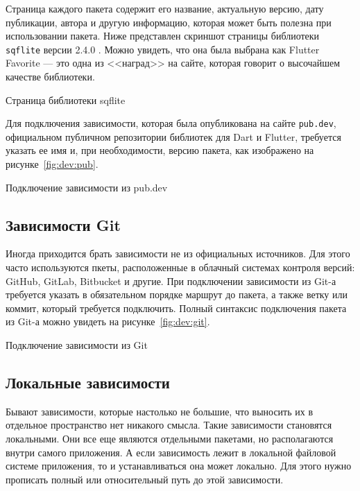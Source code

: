 Страница каждого пакета содержит его название,
актуальную версию, дату публикации, автора и другую информацию,
которая может быть полезна при использовании пакета.
Ниже представлен скриншот страницы
библиотеки \texttt{sqflite} версии 2.4.0 .
Можно увидеть, что она была выбрана
как Flutter Favorite --- это одна из <<наград>> на сайте,
которая говорит о высочайшем качестве библиотеки.

\begin{image}
	\caption{Страница библиотеки sqflite}
	\label{fig:pub}
\end{image}

Для подключения зависимости,
которая была опубликована на сайте \texttt{pub.dev},
официальном публичном репозитории библиотек для Dart и Flutter,
требуется указать ее имя и, при необходимости, версию пакета,
как изображено на рисунке~\ref{fig:dev:pub}.

\begin{image}
	\caption{Подключение зависимости из pub.dev}
	\label{fig:dev:pub}
\end{image}

\subsection{Зависимости Git}

Иногда приходится брать зависимости не из официальных источников.
Для этого часто используются пкеты,
расположенные в облачный системах контроля версий:
GitHub, GitLab, Bitbucket и другие.
При подключении зависимости из Git-а требуется указать
в обязательном порядке маршрут до пакета, а также ветку или коммит,
который требуется подключить.
Полный синтаксис подключения пакета из Git-а
можно увидеть на рисунке~\ref{fig:dev:git}.

\begin{image}
	\caption{Подключение зависимости из Git}
	\label{fig:dev:git}
\end{image}

\subsection{Локальные зависимости}

Бывают зависимости, которые настолько не большие,
что выносить их в отдельное пространство нет никакого смысла.
Такие зависимости становятся локальными.
Они все еще являются отдельными пакетами,
но располагаются внутри самого приложения.
А если зависимость лежит в локальной файловой системе приложения,
то и устанавливаться она может локально.
Для этого нужно прописать полный или относительный путь до этой зависимости.

